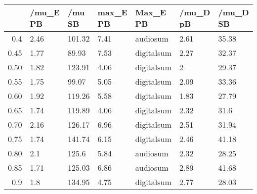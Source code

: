 \begin{table}[ht]
\centering
\begin{tabular}{rllllll}
  \hline
 & /mu\_E PB & /mu SB & max\_E PB & Max\_E PB & /mu\_D pB & /mu\_D SB \\ 
  \hline
0.4 & 2.46 & 101.32 & 7.41 & audiosum & 2.61 & 35.38 \\ 
  0.45 & 1.77 & 89.93 & 7.53 & digitalsum & 2.27 & 32.37 \\ 
  0.50 & 1.82 & 123.91 & 4.06 & digitalsum & 2 & 29.37 \\ 
  0.55 & 1.75 & 99.07 & 5.05 & digitalsum & 2.09 & 33.36 \\ 
  0.60 & 1.92 & 119.26 & 5.58 & digitalsum & 1.83 & 27.79 \\ 
  0.65 & 1.74 & 119.89 & 4.06 & digitalsum & 2.32 & 31.6 \\ 
  0.70 & 2.16 & 126.17 & 6.96 & digitalsum & 2.51 & 31.94 \\ 
  0,75 & 1.74 & 141.74 & 6.15 & digitalsum & 2.46 & 41.18 \\ 
  0.80 & 2.1 & 125.6 & 5.84 & audiosum & 2.32 & 28.25 \\ 
  0.85 & 1.71 & 125.03 & 6.86 & audiosum & 2.89 & 41.68 \\ 
  0.9 & 1.8 & 134.95 & 4.75 & digitalsum & 2.77 & 28.03 \\ 
   \hline
\end{tabular}
\end{table}
